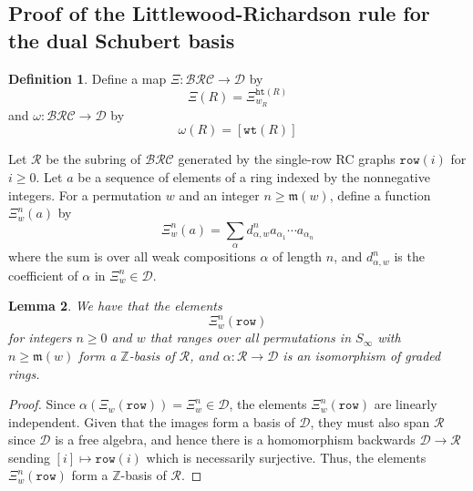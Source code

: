 \documentclass[a4paper,fleqn]{cas-sc}
\makeatletter
\newcommand{\sqcupplus@inner}[2]{%
  \vcenter{\hbox{\ooalign{%
    \hfil$\m@th#1\sqcup$\hfil\cr
    \hfil\raisebox{0.15ex}{$\m@th#1\scriptscriptstyle+$}\hfil\cr
  }}}%
}
\newcommand{\sqcupplus}{\mathbin{\mathpalette\sqcupplus@inner\relax}}
\newtheorem{lemma}{Lemma}[subsection]
\theoremstyle{definition}
\newtheorem{definition}[lemma]{Definition}
\theoremstyle{remark}
\numberwithin{equation}{subsection}
\newcommand{\wof}[1]{w_{#1}}
\newcommand{\wtt}{\mathtt{wt}}
\newcommand{\hr}{\mathtt{ht}}
\newcommand{\BRC}{\mathcal{BRC}}
\newcommand{\dsch}{\ensuremath{\Xi}}
\newcommand{\dcoma}{\mathcal{D}}
\newcommand{\maxd}{\mathfrak{m}}
\makeatother
\begin{document}
\subsection{Proof of the Littlewood-Richardson rule for the dual Schubert basis}


\begin{definition}
Define a map $\Xi:\BRC\to \dcoma$ by
$$\Xi(R) = \dsch_{\wof{R}}^{\hr(R)}$$
and $\omega:\BRC\to\dcoma$ by
$$\omega(R) = [\wtt(R)]$$

Let $\mathcal{R}$  be the subring of $\BRC$ generated by the single-row RC graphs $\mathtt{row}(i)$ for $i\geq 0$. Let $a$ be a sequence of elements of a ring indexed by the nonnegative integers. For a permutation $w$ and an integer $n\geq \maxd(w)$, define a function $\dsch_w^n(a)$ by
$$\dsch_w^n(a) = \sum_{\alpha} d_{\alpha, w}^n a_{\alpha_1} \cdots a_{\alpha_n}$$
where the sum is over all weak compositions $\alpha$ of length $n$, and $d_{\alpha, w}^n$ is the coefficient of $\alpha$ in $\dsch_w^n\in\dcoma$.
\end{definition}

\begin{lemma} \label{lemma:schubertrow}
We have that the elements
$$\dsch_w^n(\mathtt{row})$$
for integers $n\geq 0$ and $w$ that ranges over all permutations in $S_\infty$ with $n\geq \maxd(w)$ form a $\mathbb{Z}$-basis of $\mathcal{R}$, and $\alpha:\mathcal{R}\to \dcoma$ is an isomorphism of graded rings.
\end{lemma}
\begin{proof}
Since $\alpha(\dsch_w(\mathtt{row})) = \dsch_w^n\in \dcoma$, the elements $\dsch_w^n(\mathtt{row})$ are linearly independent. Given that the images form a basis of $\dcoma$, they must also span $\mathcal{R}$ since $\dcoma$ is a free algebra, and hence there is a homomorphism backwards $\dcoma\to \mathcal{R}$ sending $[i]\mapsto \mathtt{row}(i)$ which is necessarily surjective. Thus, the elements $\dsch_w^n(\mathtt{row})$ form a $\mathbb{Z}$-basis of $\mathcal{R}$.
\end{proof}
\end{document}
